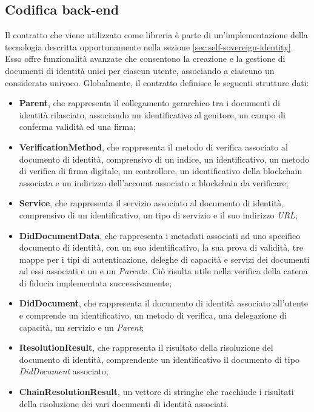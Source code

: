 \subsection{Codifica back-end}
Il contratto che viene utilizzato come libreria è parte di un'implementazione della tecnologia  descritta opportunamente nella
sezione \ref{sec:self-sovereign-identity}. Esso offre funzionalità avanzate che consentono la creazione e la gestione di documenti di identità
unici per ciascun utente, associando a ciascuno un  considerato univoco.
Globalmente, il contratto definisce le seguenti strutture dati:
\begin{itemize}
    \item \textbf{Parent}, che rappresenta il collegamento gerarchico tra i documenti di identità rilasciato, associando un identificativo al genitore,
    un campo di conferma validità ed una firma;
    \item \textbf{VerificationMethod}, che rappresenta il metodo di verifica associato al documento di identità, comprensivo di un indice, un identificativo,
    un metodo di verifica di firma digitale, un controllore, un identificativo della blockchain associata e un indirizzo dell'account associato a blockchain da verificare;
    \item \textbf{Service}, che rappresenta il servizio associato al documento di identità, comprensivo di un identificativo, un tipo di servizio e il suo indirizzo \textit{URL};
    \item \textbf{DidDocumentData}, che rappresenta i metadati associati ad uno specifico documento di identità, con un suo identificativo, la sua prova di validità, tre mappe per i tipi di autenticazione, deleghe di capacità
    e servizi dei documenti ad essi associati e un e un \textit{Parent}e. Ciò risulta utile nella verifica della catena di fiducia implementata successivamente;
    \item \textbf{DidDocument}, che rappresenta il documento di identità associato all'utente e comprende un identificativo, un metodo di verifica, una delegazione di capacità, un servizio e un \textit{Parent};
    \item \textbf{ResolutionResult}, che rappresenta il risultato della risoluzione del documento di identità, comprendente un identificativo il documento di tipo \textit{DidDocument} associato;
    \item \textbf{ChainResolutionResult}, un vettore di stringhe che racchiude i risultati della risoluzione dei vari documenti di identità associati.
\end{itemize}

